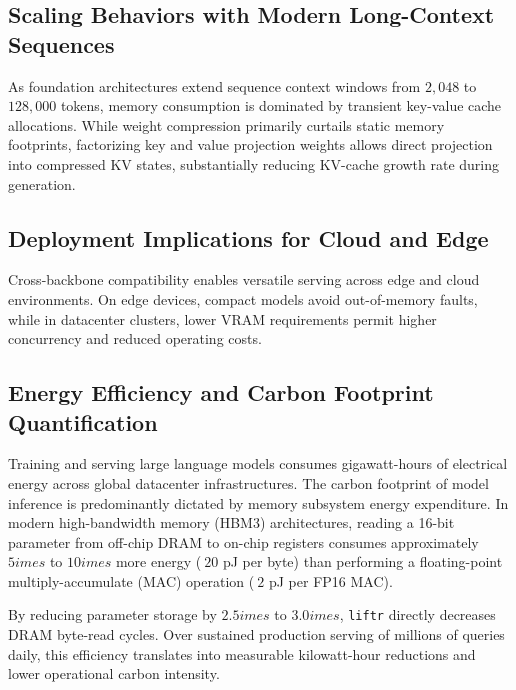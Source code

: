 \subsection{Scaling Behaviors with Modern Long-Context Sequences}
As foundation architectures extend sequence context windows from $2{,}048$ to $128{,}000$ tokens, memory consumption is dominated by transient key-value cache allocations. While weight compression primarily curtails static memory footprints, factorizing key and value projection weights allows direct projection into compressed KV states, substantially reducing KV-cache growth rate during generation.

\subsection{Deployment Implications for Cloud and Edge}
Cross-backbone compatibility enables versatile serving across edge and cloud environments. On edge devices, compact models avoid out-of-memory faults, while in datacenter clusters, lower VRAM requirements permit higher concurrency and reduced operating costs.

\subsection{Energy Efficiency and Carbon Footprint Quantification}
Training and serving large language models consumes gigawatt-hours of electrical energy across global datacenter infrastructures. The carbon footprint of model inference is predominantly dictated by memory subsystem energy expenditure. In modern high-bandwidth memory (HBM3) architectures, reading a 16-bit parameter from off-chip DRAM to on-chip registers consumes approximately $5	imes$ to $10	imes$ more energy ($~20$ pJ per byte) than performing a floating-point multiply-accumulate (MAC) operation ($~2$ pJ per FP16 MAC).

By reducing parameter storage by $2.5	imes$ to $3.0	imes$, \texttt{liftr} directly decreases DRAM byte-read cycles. Over sustained production serving of millions of queries daily, this efficiency translates into measurable kilowatt-hour reductions and lower operational carbon intensity.
